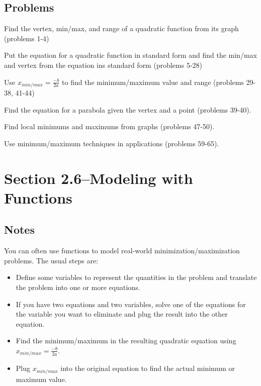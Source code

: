 \documentclass{article}
\begin{document}
\subsection{Problems}

\begin{itemize*}
  \item Find the vertex, min/max, and range of a quadratic function from its graph (problems 1-4)

  \item Put the equation for a quadratic function in standard form and find the min/max and vertex from the equation ins
    standard form (problems 5-28)

  \item Use $x_{min/max} = \frac{-b}{2a}$ to find the minimum/maximum value and range (problems 29-38, 41-44)

  \item Find the equation for a parabola given the vertex and a point (problems 39-40).

  \item Find local minimums and maximums from graphs (problems 47-50).

  \item Use minimum/maximum techniques in applications (problems 59-65).

\end{itemize*}

\section{Section 2.6--Modeling with Functions}

\subsection{Notes}

You can often use functions to model real-world minimization/maximization problems.  The usual steps are:
\begin{itemize}
  \item Define some variables to represent the quantities in the problem and translate the problem into one or more equations.

  \item If you have two equations and two variables, solve one of the equations for the variable you
    want to eliminate and plug the result into the other equation.

  \item Find the minimum/maximum in the resulting quadratic equation using $x_{min/max} = \frac{-b}{2a}$.

  \item Plug $x_{min/max}$ into the original equation to find the actual minimum or maximum value.
\end{itemize}
\end{document}
